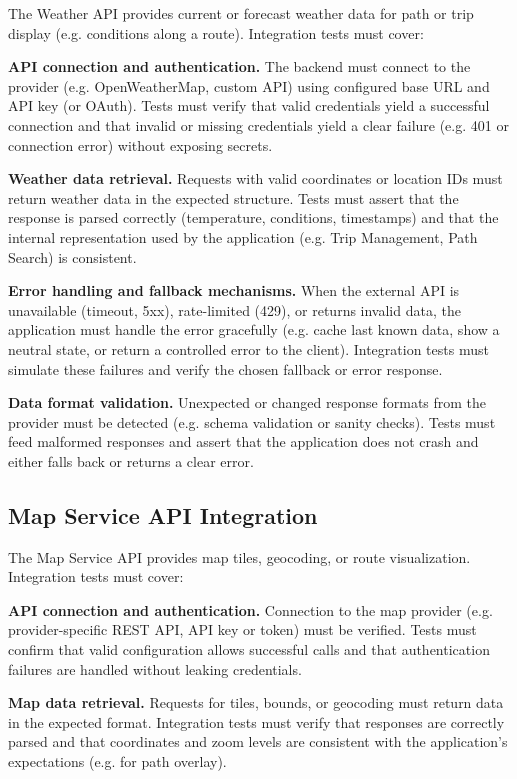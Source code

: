 The Weather API provides current or forecast weather data for path or trip display (e.g. conditions along a route). Integration tests must cover:

\textbf{API connection and authentication.}
The backend must connect to the provider (e.g. OpenWeatherMap, custom API) using configured base URL and API key (or OAuth). Tests must verify that valid credentials yield a successful connection and that invalid or missing credentials yield a clear failure (e.g. 401 or connection error) without exposing secrets.

\textbf{Weather data retrieval.}
Requests with valid coordinates or location IDs must return weather data in the expected structure. Tests must assert that the response is parsed correctly (temperature, conditions, timestamps) and that the internal representation used by the application (e.g. Trip Management, Path Search) is consistent.

\textbf{Error handling and fallback mechanisms.}
When the external API is unavailable (timeout, 5xx), rate-limited (429), or returns invalid data, the application must handle the error gracefully (e.g. cache last known data, show a neutral state, or return a controlled error to the client). Integration tests must simulate these failures and verify the chosen fallback or error response.

\textbf{Data format validation.}
Unexpected or changed response formats from the provider must be detected (e.g. schema validation or sanity checks). Tests must feed malformed responses and assert that the application does not crash and either falls back or returns a clear error.

\subsection{Map Service API Integration}
\label{subsec:map_service_api_integration}%

The Map Service API provides map tiles, geocoding, or route visualization. Integration tests must cover:

\textbf{API connection and authentication.}
Connection to the map provider (e.g. provider-specific REST API, API key or token) must be verified. Tests must confirm that valid configuration allows successful calls and that authentication failures are handled without leaking credentials.

\textbf{Map data retrieval.}
Requests for tiles, bounds, or geocoding must return data in the expected format. Integration tests must verify that responses are correctly parsed and that coordinates and zoom levels are consistent with the application's expectations (e.g. for path overlay).

